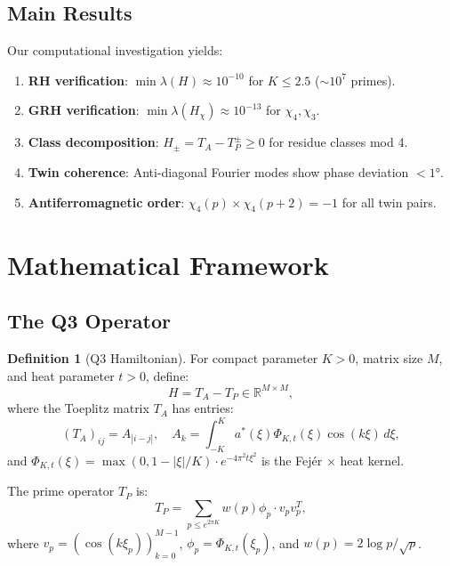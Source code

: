 \documentclass[11pt,a4paper]{article}
\theoremstyle{definition}
\newtheorem{definition}[theorem]{Definition}
\newcommand{\R}{\mathbb{R}}
\begin{document}
\subsection{Main Results}

Our computational investigation yields:
\begin{enumerate}
    \item \textbf{RH verification}: $\min\lambda(H) \approx 10^{-10}$ for $K \leq 2.5$ ($\sim 10^7$ primes).
    \item \textbf{GRH verification}: $\min\lambda(H_\chi) \approx 10^{-13}$ for $\chi_4, \chi_3$.
    \item \textbf{Class decomposition}: $H_\pm = T_A - T_P^\pm \geq 0$ for residue classes mod 4.
    \item \textbf{Twin coherence}: Anti-diagonal Fourier modes show phase deviation $< 1°$.
    \item \textbf{Antiferromagnetic order}: $\chi_4(p) \times \chi_4(p+2) = -1$ for all twin pairs.
\end{enumerate}

\section{Mathematical Framework}

\subsection{The Q3 Operator}

\begin{definition}[Q3 Hamiltonian]
For compact parameter $K > 0$, matrix size $M$, and heat parameter $t > 0$, define:
\begin{equation}
H = T_A - T_P \in \R^{M \times M},
\end{equation}
where the Toeplitz matrix $T_A$ has entries:
\begin{equation}
(T_A)_{ij} = A_{|i-j|}, \quad A_k = \int_{-K}^K a^*(\xi) \Phi_{K,t}(\xi) \cos(k\xi) \, d\xi,
\end{equation}
and $\Phi_{K,t}(\xi) = \max(0, 1-|\xi|/K) \cdot e^{-4\pi^2 t \xi^2}$ is the Fejér $\times$ heat kernel.
\end{definition}

The prime operator $T_P$ is:
\begin{equation}
T_P = \sum_{p \leq e^{2\pi K}} w(p) \phi_p \cdot v_p v_p^T,
\end{equation}
where $v_p = (\cos(k\xi_p))_{k=0}^{M-1}$, $\phi_p = \Phi_{K,t}(\xi_p)$, and $w(p) = 2\log p/\sqrt{p}$.
\end{document}
